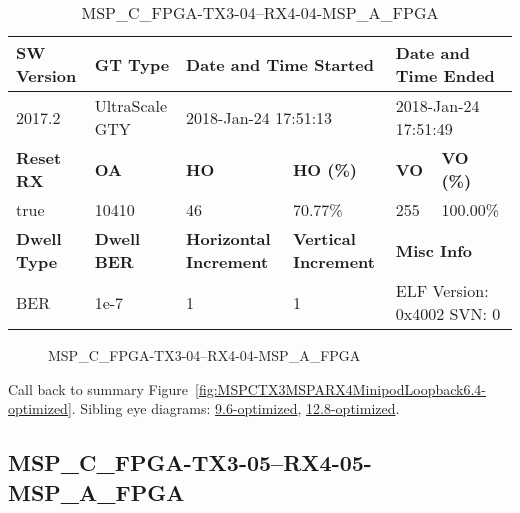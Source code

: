 \begin{table}[h]
\centering
\caption{MSP\_C\_FPGA-TX3-04--RX4-04-MSP\_A\_FPGA}
\label{tab:MSPCFPGATX304RX404MSPAFPGA6.4-optimized}
\begin{tabular}{@{}|l|l|l|l|l|l|@{}}
\toprule
\textbf{SW Version}                & \textbf{GT Type}   & \multicolumn{2}{l|}{\textbf{Date and Time Started}}            & \multicolumn{2}{l|}{\textbf{Date and Time Ended}}        \\ \midrule
2017.2                       & UltraScale GTY          & \multicolumn{2}{l|}{2018-Jan-24 17:51:13}                   & \multicolumn{2}{l|}{2018-Jan-24 17:51:49}               \\ \midrule
\textbf{Reset RX}                  & \textbf{OA} & \textbf{HO}   & \textbf{HO (\%)} & \textbf{VO} & \textbf{VO (\%)} \\ \midrule
true & 10410        & 46          & 70.77\%        & 255        & 100.00\%       \\ \midrule
\textbf{Dwell Type}                & \textbf{Dwell BER} & \textbf{Horizontal Increment} & \textbf{Vertical Increment}    & \multicolumn{2}{l|}{\textbf{Misc Info}}                  \\ \midrule
BER                            & 1e-7        & 1        & 1           & \multicolumn{2}{l|}{ELF Version: 0x4002 SVN: 0}                         \\ \bottomrule
\end{tabular}
\end{table}

\begin{figure}[h]
\caption{MSP\_C\_FPGA-TX3-04--RX4-04-MSP\_A\_FPGA} \label{fig:MSPCFPGATX304RX404MSPAFPGA6.4-optimized}
\end{figure}

Call back to summary Figure~\ref{fig:MSPCTX3MSPARX4MinipodLoopback6.4-optimized}.
Sibling eye diagrams: \hyperref[sec:MSPCFPGATX304RX404MSPAFPGA9.6-optimized]{9.6-optimized}, \hyperref[sec:MSPCFPGATX304RX404MSPAFPGA12.8-optimized]{12.8-optimized}.

\clearpage
\newpage


\subsection{MSP\_C\_FPGA-TX3-05--RX4-05-MSP\_A\_FPGA}\label{sec:MSPCFPGATX305RX405MSPAFPGA6.4-optimized}

